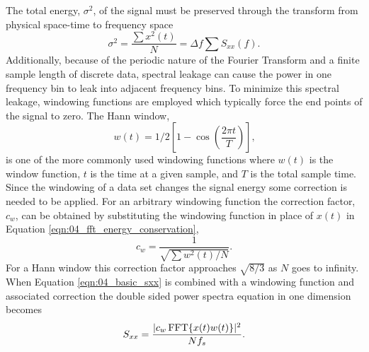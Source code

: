 The total energy, $\sigma^2$, of the signal must be preserved through the transform from physical space-time to frequency space
\begin{equation}
  \sigma^2 = \frac{\sum x^2(t)}{N} = \Delta f\sum S_{xx}(f) \textrm{.}
  \label{eqn:04_fft_energy_conservation}
\end{equation}
Additionally, because of the periodic nature of the Fourier Transform and a finite sample length of discrete data, spectral leakage can cause the power in one frequency bin to leak into adjacent frequency bins.
To minimize this spectral leakage, windowing functions are employed which typically force the end points of the signal to zero.
The Hann window,
\begin{equation}
 w(t) = 1/2\left[1-\cos\left(\frac{2\pi t}{T}\right)\right] \textrm{,}
 \label{eqn:04_hann_window}
\end{equation}
is one of the more commonly used windowing functions \cite{Braun-2001-qhqBfvYz} where $w(t)$ is the window function, $t$ is the time at a given sample, and $T$ is the total sample time.
Since the windowing of a data set changes the signal energy some correction is needed to be applied.
For an arbitrary windowing function the correction factor, $c_w$, can be obtained by substituting the windowing function in place of $x(t)$ in Equation \ref{eqn:04_fft_energy_conservation},
\begin{equation}
 c_w = \frac{1}{\sqrt{\sum w^2(t)/N}} \textrm{.}
 \label{eqn:04_window_correction}
\end{equation}
For a Hann window this correction factor approaches $\sqrt{8/3}$ as $N$ goes to infinity.
When Equation \ref{eqn:04_basic_sxx} is combined with a windowing function and associated correction the double sided power spectra equation in one dimension becomes
\begin{equation}
 S_{xx} = \frac{|c_w\operatorname{FFT}\{x(t) w(t)\}|^2}{Nf_{s}} \textrm{.}
 \label{eqn:04_windowed_sxx}
\end{equation}

